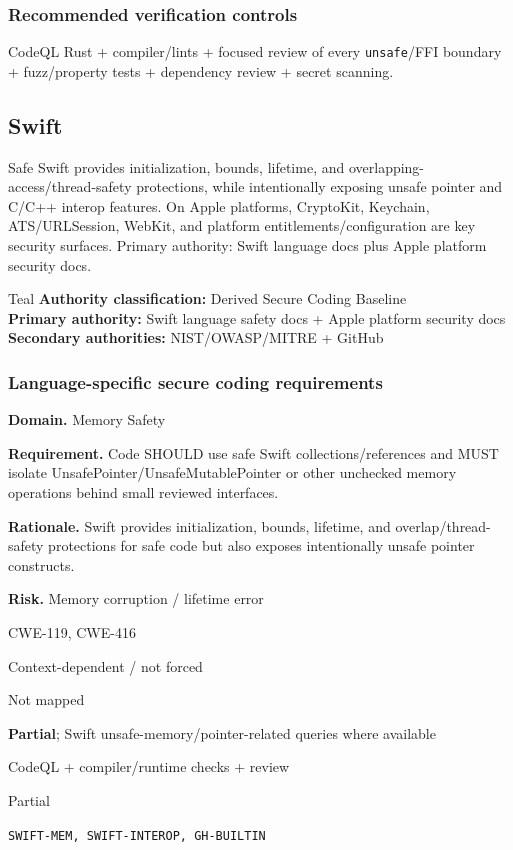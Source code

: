 \documentclass[10pt,letterpaper]{article}
\newcommand{\code}[1]{\texttt{\small #1}}
\newcommand{\prioritybadge}[2]{\tcbox[on line,boxrule=0pt,arc=1.2mm,boxsep=0.7mm,left=1mm,right=1mm,top=0.4mm,bottom=0.4mm,colback=#2!12,coltext=#2]{\scriptsize\bfseries #1}}
\begin{document}
\subsubsection*{Recommended verification controls}
CodeQL Rust + compiler/lints + focused review of every \code{unsafe}/FFI boundary + fuzz/property tests + dependency review + secret scanning.
\clearpage
\subsection{Swift}
Safe Swift provides initialization, bounds, lifetime, and overlapping-access/thread-safety protections, while intentionally exposing unsafe pointer and C/C++ interop features. On Apple platforms, CryptoKit, Keychain, ATS/URLSession, WebKit, and platform entitlements/configuration are key security surfaces. Primary authority: Swift language docs plus Apple platform security docs.
\begin{callout}{Teal}
\textbf{Authority classification:} Derived Secure Coding Baseline\\
\textbf{Primary authority:} Swift language safety docs + Apple platform security docs\\
\textbf{Secondary authorities:} NIST/OWASP/MITRE + GitHub
\end{callout}
\subsubsection*{Language-specific secure coding requirements}

\begin{rulebox}[title={\texttt{SCS-SWIFT-MEM-001} \hfill \prioritybadge{Critical Control}{Critical}}]
\textbf{Domain.} Memory Safety

\textbf{Requirement.} Code SHOULD use safe Swift collections/references and MUST isolate UnsafePointer/UnsafeMutablePointer or other unchecked memory operations behind small reviewed interfaces.

\textbf{Rationale.} Swift provides initialization, bounds, lifetime, and overlap/thread-safety protections for safe code but also exposes intentionally unsafe pointer constructs.

\textbf{Risk.} Memory corruption / lifetime error

\begin{description}[leftmargin=2.65cm,labelwidth=2.3cm,style=nextline,itemsep=1pt,topsep=3pt]
  \item[CWE] CWE-119, CWE-416
  \item[OWASP] Context-dependent / not forced
  \item[CERT] Not mapped
  \item[CodeQL] \textbf{Partial}; Swift unsafe-memory/pointer-related queries where available
  \item[Enforcement] CodeQL + compiler/runtime checks + review
  \item[Automation] Partial
  \item[Sources] \texttt{SWIFT-MEM, SWIFT-INTEROP, GH-BUILTIN}
\end{description}
\end{rulebox}
\end{document}
